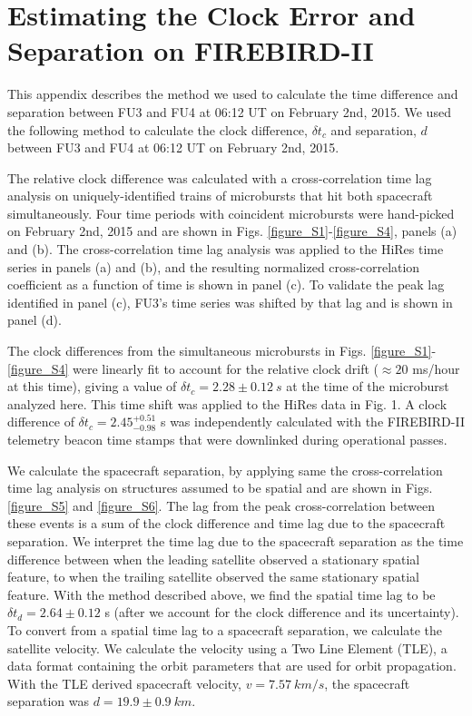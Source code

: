 
\chapter{Estimating the Clock Error and Separation on FIREBIRD-II}\label{appendixb}
This appendix describes the method we used to calculate the time difference and separation between FU3 and FU4 at 06:12 UT on February 2nd, 2015. We used the following method to calculate the clock difference, $\delta t_{c}$  and separation, $d$ between FU3 and FU4 at 06:12 UT on February 2nd, 2015.

The relative clock difference was calculated with a cross-correlation time lag analysis on uniquely-identified trains of microbursts that hit both spacecraft simultaneously. Four time periods with coincident microbursts were hand-picked on February 2nd, 2015 and are shown in Figs. \ref{figure_S1}-\ref{figure_S4}, panels (a) and (b). The cross-correlation time lag analysis was applied to the HiRes time series in panels (a) and (b), and the resulting normalized cross-correlation coefficient as a function of time is shown in panel (c). To validate the peak lag identified in panel (c), FU3's time series was shifted by that lag and is shown in panel (d).

The clock differences from the simultaneous microbursts in Figs. \ref{figure_S1}-\ref{figure_S4} were linearly fit to account for the relative clock drift (${\approx} 20$ ms/hour at this time), giving a value of $\delta t_{c} = 2.28 \pm 0.12 \ s$ at the time of the microburst analyzed here. This time shift was applied to the HiRes data in Fig. 1. A clock difference of $\delta t_{c}  = 2.45^{+ 0.51}_{-0.98}$ s was independently calculated with the FIREBIRD-II telemetry beacon time stamps that were downlinked during operational passes.

We calculate the spacecraft separation, by applying same the cross-correlation time lag analysis on structures assumed to be spatial and are shown in Figs. \ref{figure_S5} and \ref{figure_S6}. The lag from the peak cross-correlation between these events is a sum of the clock difference and time lag due to the spacecraft separation. We interpret the time lag due to the spacecraft separation as the time difference between when the leading satellite observed a stationary spatial feature, to when the trailing satellite observed the same stationary spatial feature. With the method described above, we find the spatial time lag to be $\delta t_{d} = 2.64 \pm 0.12$ s (after we account for the clock difference and its uncertainty). To convert from a spatial time lag to a spacecraft separation, we calculate the satellite velocity. We calculate the velocity using a Two Line Element (TLE), a data format containing the orbit parameters that are used for orbit propagation. With the TLE derived spacecraft velocity, $v = 7.57 \ km/s$, the spacecraft separation was $d = 19.9 \pm 0.9 \ km $.

